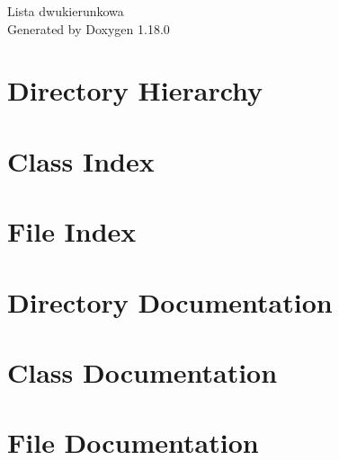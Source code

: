 \documentclass[twoside]{book}
\newcommand{\+}{\discretionary{\mbox{\scriptsize$\hookleftarrow$}}{}{}}
\newcommand{\clearemptydoublepage}{%
    \newpage{\pagestyle{empty}\cleardoublepage}%
  }
\begin{document}
  \raggedbottom
    \hypersetup{pageanchor=false,
                bookmarksnumbered=true,
                pdfencoding=unicode
               }
  \begin{titlepage}
  \vspace*{7cm}
  \begin{center}%
  {\Large Lista dwukierunkowa}\\
  \vspace*{1cm}
  {\large Generated by Doxygen 1.18.0}\\
  \end{center}
  \end{titlepage}
  \clearemptydoublepage
  \tableofcontents
  \clearemptydoublepage
  \hypersetup{pageanchor=true}
\chapter{Directory Hierarchy}

\chapter{Class Index}

\chapter{File Index}

\chapter{Directory Documentation}

\chapter{Class Documentation}




\chapter{File Documentation}













  \backmatter
  \newpage
  \clearemptydoublepage
  \printindex
\end{document}
